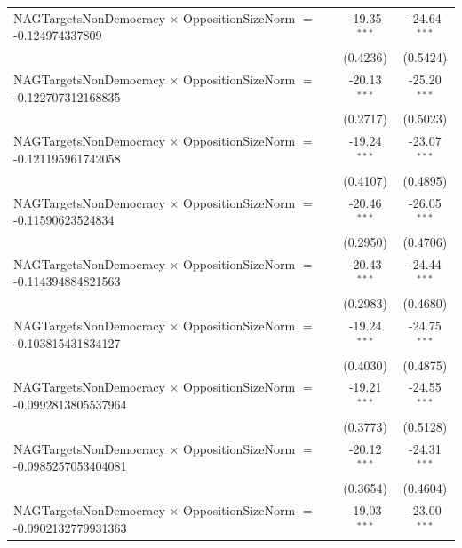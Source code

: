 \begin{tabular}{lcc}
   NAGTargetsNonDemocracy $\times$ OppositionSizeNorm $=$ -0.124974337809       & -19.35$^{***}$       & -24.64$^{***}$\\   
                                                                                & (0.4236)             & (0.5424)\\   
   NAGTargetsNonDemocracy $\times$ OppositionSizeNorm $=$ -0.122707312168835    & -20.13$^{***}$       & -25.20$^{***}$\\   
                                                                                & (0.2717)             & (0.5023)\\   
   NAGTargetsNonDemocracy $\times$ OppositionSizeNorm $=$ -0.121195961742058    & -19.24$^{***}$       & -23.07$^{***}$\\   
                                                                                & (0.4107)             & (0.4895)\\   
   NAGTargetsNonDemocracy $\times$ OppositionSizeNorm $=$ -0.11590623524834     & -20.46$^{***}$       & -26.05$^{***}$\\   
                                                                                & (0.2950)             & (0.4706)\\   
   NAGTargetsNonDemocracy $\times$ OppositionSizeNorm $=$ -0.114394884821563    & -20.43$^{***}$       & -24.44$^{***}$\\   
                                                                                & (0.2983)             & (0.4680)\\   
   NAGTargetsNonDemocracy $\times$ OppositionSizeNorm $=$ -0.103815431834127    & -19.24$^{***}$       & -24.75$^{***}$\\   
                                                                                & (0.4030)             & (0.4875)\\   
   NAGTargetsNonDemocracy $\times$ OppositionSizeNorm $=$ -0.0992813805537964   & -19.21$^{***}$       & -24.55$^{***}$\\   
                                                                                & (0.3773)             & (0.5128)\\   
   NAGTargetsNonDemocracy $\times$ OppositionSizeNorm $=$ -0.0985257053404081   & -20.12$^{***}$       & -24.31$^{***}$\\   
                                                                                & (0.3654)             & (0.4604)\\   
   NAGTargetsNonDemocracy $\times$ OppositionSizeNorm $=$ -0.0902132779931363   & -19.03$^{***}$       & -23.00$^{***}$\\   

\end{tabular}
